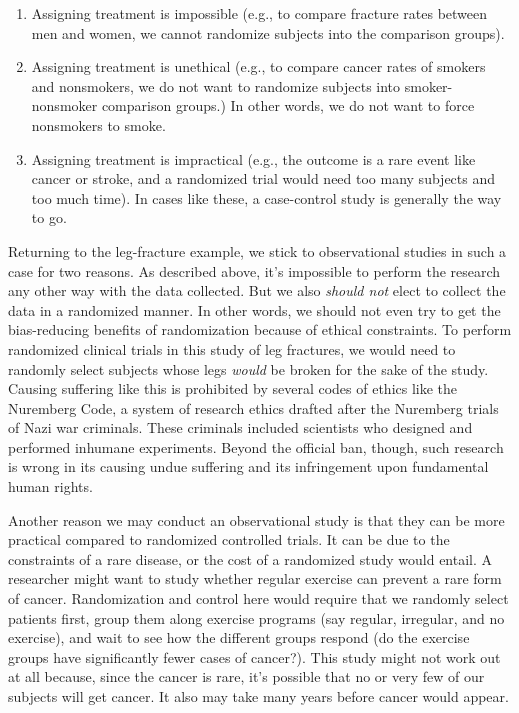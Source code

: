 \documentclass[11pt]{book}\usepackage[]{graphicx}\usepackage[]{color}
\begin{document}
\begin{enumerate}
\item Assigning treatment is impossible (e.g., to compare fracture rates between men and women, we cannot randomize subjects into the comparison groups).

\item Assigning treatment is unethical (e.g., to compare cancer rates of smokers and nonsmokers, we do not want to randomize subjects into smoker-nonsmoker     comparison groups.)  In other words, we do not want to force nonsmokers to smoke.

\item Assigning treatment is impractical (e.g., the outcome is a rare event like cancer or stroke, and a randomized trial would need too many subjects and too much time).  In cases like these, a case-control study is generally the way to go.
\end{enumerate}


Returning to the leg-fracture example, we stick to observational studies in such a case for two reasons. As described above, it's impossible to perform the research any other way with the data collected. But we also \textit{should not} elect to collect the data in a randomized manner.  In other words, we should not even try to get the bias-reducing benefits of randomization because of ethical constraints. To perform randomized clinical trials in this study of leg fractures, we would need to randomly select subjects whose legs \textit{would} be broken for the sake of the study. Causing suffering like this is prohibited by several codes of ethics like the Nuremberg Code, a system of research ethics drafted after the Nuremberg trials of Nazi war criminals.  These criminals included scientists who designed and performed inhumane experiments. Beyond the official ban, though, such research is wrong in its causing undue suffering and its infringement upon fundamental human rights.

Another reason we may conduct an observational study is that they can be more practical compared to randomized controlled trials. It can be due to the constraints of a rare disease, or the cost of a randomized study would entail.  A researcher might want to study whether regular exercise can prevent a rare form of cancer.  Randomization and control here would require that we randomly select patients first, group them along exercise programs (say regular, irregular, and no exercise), and wait to see how the different groups respond (do the exercise groups have significantly fewer cases of cancer?).  This study might not work out at all because, since the cancer is rare, it's possible that no or very few of our subjects will get cancer.  It also may take many years before cancer would appear.
\end{document}
